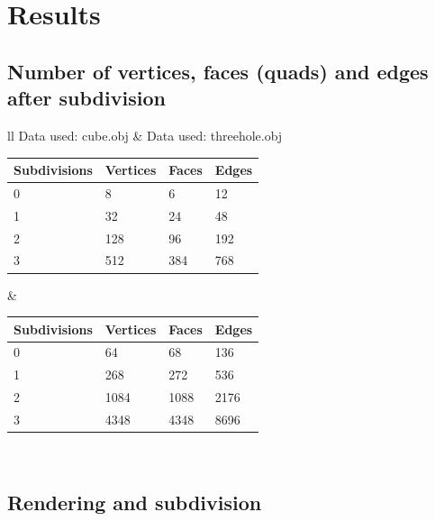 \documentclass[12pt,a4paper]{scrartcl}
\begin{document}
\section{Results}
\subsection{Number of vertices, faces (quads) and edges after subdivision}

\begin{tabular}{ll}
	Data used: cube.obj & Data used: threehole.obj \\
	\begin{tabular}{|l|l|l|l|}
		\hline
		Subdivisions & Vertices & Faces & Edges \\
		\hline
		0 & 8 & 6 & 12 \\
		\hline
		1 & 32 & 24 & 48 \\
		\hline
		2 & 128 & 96 & 192 \\
		\hline
		3 & 512 & 384 & 768 \\
		\hline
	\end{tabular}
	&
	\begin{tabular}{|l|l|l|l|}
		\hline
		Subdivisions & Vertices & Faces & Edges \\
		\hline
		0 & 64 & 68 & 136 \\
		\hline
		1 & 268 & 272 & 536 \\
		\hline
		2 & 1084 & 1088 & 2176 \\
		\hline
		3 & 4348 & 4348 & 8696 \\
		\hline
	\end{tabular}
	\\
\end{tabular}


\subsection{Rendering and subdivision}
\end{document}
